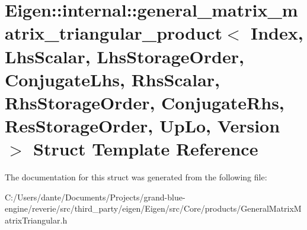\hypertarget{struct_eigen_1_1internal_1_1general__matrix__matrix__triangular__product}{}\section{Eigen\+::internal\+::general\+\_\+matrix\+\_\+matrix\+\_\+triangular\+\_\+product$<$ Index, Lhs\+Scalar, Lhs\+Storage\+Order, Conjugate\+Lhs, Rhs\+Scalar, Rhs\+Storage\+Order, Conjugate\+Rhs, Res\+Storage\+Order, Up\+Lo, Version $>$ Struct Template Reference}
\label{struct_eigen_1_1internal_1_1general__matrix__matrix__triangular__product}


The documentation for this struct was generated from the following file\+:\begin{DoxyCompactItemize}
\item 
C\+:/\+Users/dante/\+Documents/\+Projects/grand-\/blue-\/engine/reverie/src/third\+\_\+party/eigen/\+Eigen/src/\+Core/products/General\+Matrix\+Matrix\+Triangular.\+h\end{DoxyCompactItemize}
